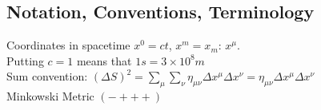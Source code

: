 \subsection{Notation, Conventions, Terminology}
Coordinates in spacetime $x^0 = ct$, $x^m = x_m$: $x^\mu$.\\
Putting $c=1$ means that $1s = 3\times 10^8 m$\\
Sum convention: $(\Delta S)^2 = \sum_\mu \sum_\nu \eta_{\mu\nu} \Delta x^\mu \Delta x^\nu = \eta_{\mu\nu} \Delta x^\mu \Delta x^\nu$\\
Minkowski Metric $(-+++)$\\








